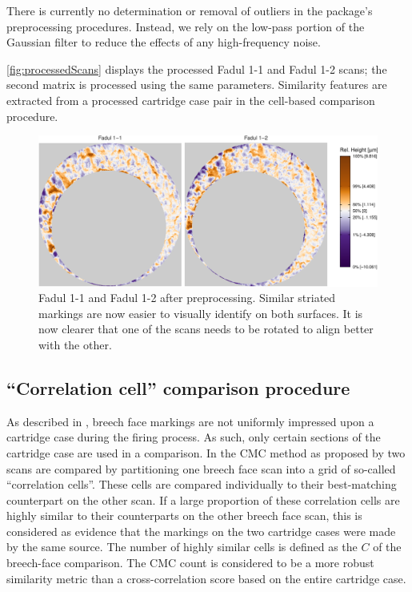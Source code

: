 There is currently no determination or removal of outliers in the
 package's preprocessing procedures. Instead, we rely on
the low-pass portion of the Gaussian filter to reduce the effects of any
high-frequency noise.

\autoref{fig:processedScans} displays the processed Fadul 1-1 and Fadul
1-2 scans; the second matrix is processed using the same parameters.
Similarity features are extracted from a processed cartridge case pair
in the cell-based comparison procedure.

\begin{Schunk}
\begin{figure}[htbp]

{\centering \includegraphics[width=\textwidth]{figures/cmcr-unnamed-chunk-10-1}

}

\caption{\label{fig:processedScans} Fadul 1-1 and Fadul 1-2 after preprocessing. Similar striated markings are now easier to visually identify on both surfaces. It is now clearer that one of the scans needs to be rotated to align better with the other.}\label{fig:unnamed-chunk-10}
\end{figure}
\end{Schunk}

\hypertarget{comparisonProcedure}{%
\subsection{``Correlation cell'' comparison
procedure}\label{comparisonProcedure}}

As described in \citet{song_proposed_2013}, breech face markings are not
uniformly impressed upon a cartridge case during the firing process. As
such, only certain sections of the cartridge case are used in a
comparison. In the CMC method as proposed by \citet{song_proposed_2013}
two scans are compared by partitioning one breech face scan into a grid
of so-called ``correlation cells''. These cells are compared
individually to their best-matching counterpart on the other scan. If a
large proportion of these correlation cells are highly similar to their
counterparts on the other breech face scan, this is considered as
evidence that the markings on the two cartridge cases were made by the
same source. The number of highly similar cells is defined as the
 \(C\) \citep{song_proposed_2013} of the breech-face
comparison. The CMC count is considered to be a more robust similarity
metric than a cross-correlation score based on the entire cartridge
case.

